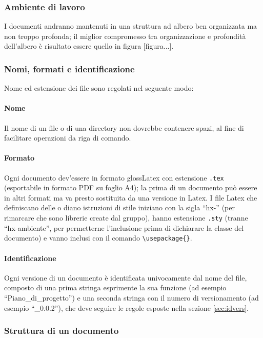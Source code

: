 \subsubsection{Ambiente di lavoro} I documenti andranno mantenuti in una struttura ad albero ben organizzata ma non troppo profonda; il miglior compromesso tra organizzazione e profondità dell'albero è risultato essere quello in figura [figura...].

\subsubsection{Nomi, formati e identificazione} Nome ed estensione dei file sono regolati nel seguente modo:
\paragraph{Nome} Il nome di un file o di una directory non dovrebbe contenere spazi, al fine di facilitare operazioni da riga di comando.
\paragraph{Formato} Ogni documento dev'essere in formato gloss{Latex} con estensione \texttt{.tex} (esportabile in formato PDF su foglio A4); la prima  di un documento può essere in altri formati ma va presto sostituita da una versione in Latex. I file Latex che definiscano delle  o diano istruzioni di stile iniziano con la sigla “hx-” (per rimarcare che sono librerie create dal gruppo), hanno estensione \texttt{.sty} (tranne “hx-ambiente”, per permetterne l'inclusione prima di dichiarare la classe del documento) e vanno inclusi con il comando \texttt{\textbackslash usepackage\{\}}.
\paragraph{Identificazione} Ogni versione di un documento è identificata univocamente dal nome del file, composto di una prima stringa esprimente la sua funzione (ad esempio “Piano\_di\_progetto”) e una seconda stringa con il numero di versionamento (ad esempio “\_0.0.2”), che deve seguire le regole esposte nella sezione \ref{sec:idvers}.

\subsubsection{Struttura di un documento}
